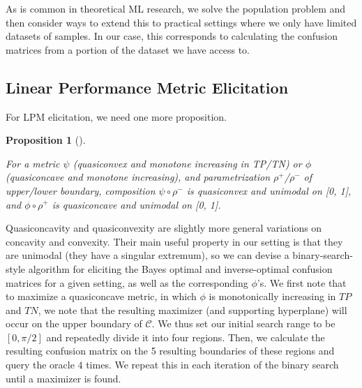 \documentclass[
  letterpaper,
  numbers=noenddot,
  DIV=11]{scrreprt}
\theoremstyle{plain}
\newtheorem{proposition}{Proposition}[chapter]
\theoremstyle{definition}
\theoremstyle{remark}
\begin{document}
As is common in theoretical ML research, we solve the population problem
and then consider ways to extend this to practical settings where we
only have limited datasets of samples. In our case, this corresponds to
calculating the confusion matrices from a portion of the dataset we have
access to.

\subsection{Linear Performance Metric Elicitation}\label{sec-orgb6dac4e}

For LPM elicitation, we need one more proposition.

\begin{tcolorbox}[colframe=.grey, title=\faPenSquare \enspace Proposition]

\begin{proposition}[]\protect\hypertarget{prp-prp3.2}{}\label{prp-prp3.2}

For a metric \(\psi\) (quasiconvex and monotone increasing in TP/TN) or
\(\phi\) (quasiconcave and monotone increasing), and parametrization
\(\rho^+\)/\(\rho^-\) of upper/lower boundary, composition
\(\psi \circ \rho^-\) is quasiconvex and unimodal on {[}0, 1{]}, and
\(\phi \circ \rho^+\) is quasiconcave and unimodal on {[}0, 1{]}.

\end{proposition}

\end{tcolorbox}

Quasiconcavity and quasiconvexity are slightly more general variations
on concavity and convexity. Their main useful property in our setting is
that they are unimodal (they have a singular extremum), so we can devise
a binary-search-style algorithm for eliciting the Bayes optimal and
inverse-optimal confusion matrices for a given setting, as well as the
corresponding \(\phi\)'s. We first note that to maximize a quasiconcave
metric, in which \(\phi\) is monotonically increasing in \(TP\) and
\(TN\), we note that the resulting maximizer (and supporting hyperplane)
will occur on the upper boundary of \(\mathcal{C}\). We thus set our
initial search range to be \([0, \pi/2]\) and repeatedly divide it into
four regions. Then, we calculate the resulting confusion matrix on the 5
resulting boundaries of these regions and query the oracle \(4\) times.
We repeat this in each iteration of the binary search until a maximizer
is found.
\end{document}
